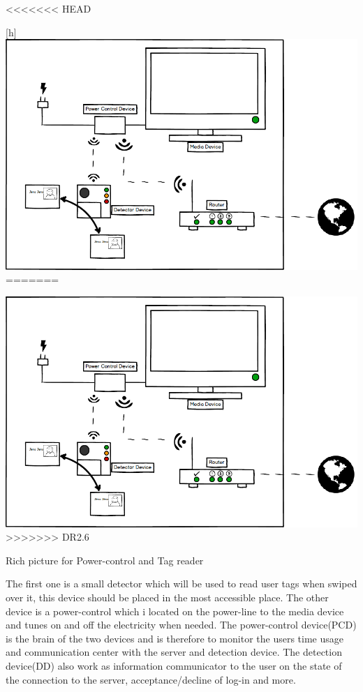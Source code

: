 <<<<<<< HEAD
\begin{center}[h]
	\centering
		\includegraphics[width=1.00\textwidth]{images/Power&Tagdevice.png}
=======
\begin{center}
	\includegraphics[width=1.00\textwidth]{images/Power&Tagdevice.png}	
>>>>>>> DR2.6
	\caption{Rich picture for Power-control and Tag reader}
	\label{fig:Power&Tagdevice}
\end{center}

The first one is a small detector which will be used to read user tags when swiped over it, this device should be placed in the most accessible place. \newline
The other device is a power-control which i located on the power-line to the media device and tunes on and off the electricity when needed.\newline
The power-control device(PCD) is the brain of the two devices and is therefore to monitor the users time usage and communication center with the server and detection device. \newline
The detection device(DD) also work as information communicator to the user on the state of the connection to the server, acceptance/decline of log-in and more. \newline    


\end{center}
